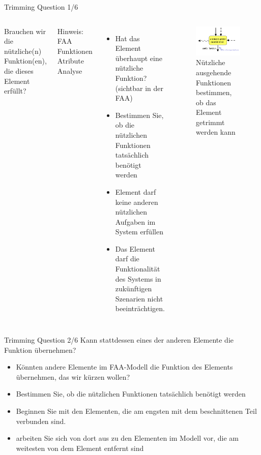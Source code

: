 \documentclass{beamer}
\begin{document}
	
	\begin{frame}{Trimming Question 1/6}
		\begin{columns}
		Brauchen wir die nützliche(n) Funktion(en), die dieses Element erfüllt?
		
		Hinweis: FAA Funktionen Atribute Analyse
		\begin{itemize}
			\item Hat das Element überhaupt eine nützliche Funktion? (sichtbar in der FAA)
			\item Bestimmen Sie, ob die nützlichen Funktionen tatsächlich benötigt werden
			\item Element darf keine anderen nützlichen Aufgaben im System erfüllen
			\item Das Element darf die Funktionalität des Systems in zukünftigen Szenarien nicht beeinträchtigen.
		\end{itemize}
			\begin{figure}
				\centering
				\includegraphics[width=1.1\textwidth]{img/q1.png}
				\caption{Nützliche ausgehende Funktionen bestimmen, ob das Element getrimmt werden kann}
			\end{figure}	
		\end{columns}
	\end{frame}
	
	\begin{frame}{Trimming Question 2/6}
		Kann stattdessen eines der anderen Elemente die Funktion übernehmen?
		\begin{itemize}
			\item Könnten andere Elemente im FAA-Modell die Funktion des Elements übernehmen, das wir kürzen wollen?
			\item Bestimmen Sie, ob die nützlichen Funktionen tatsächlich benötigt werden
			\item Beginnen Sie mit den Elementen, die am engsten mit dem beschnittenen Teil verbunden sind.
			\item arbeiten Sie sich von dort aus zu den Elementen im Modell vor, die am weitesten von dem Element entfernt sind
		\end{itemize}
	\end{frame}
	
\end{document}
